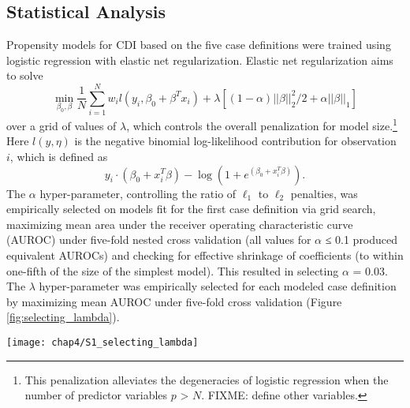 \subsection{Statistical Analysis}

Propensity models for CDI based on the five case definitions were trained using logistic regression with elastic net regularization. Elastic net regularization aims to solve $$\min_{\beta_0,\beta} \frac{1}{N} \sum_{i=1}^{N} w_i l(y_i,\beta_0+\beta^T x_i) + \lambda\left[(1-\alpha)||\beta||_2^2/2 + \alpha ||\beta||_1\right]$$ over a grid of values of $\lambda$, which controls the overall penalization for model size.\footnote{This penalization alleviates the degeneracies of logistic regression when the number of predictor variables $p$ > $N$. FIXME: define other variables.} Here $l(y,\eta)$ is the negative binomial log-likelihood contribution for observation $i$, which is defined as $$y_i \cdot (\beta_0 + x_i^T \beta) - \log (1+e^{(\beta_0+x_i^T \beta)}).$$ The $\alpha$ hyper-parameter, controlling the ratio of $\ell_1$ to $\ell_2$ penalties, was empirically selected on models fit for the first case definition via grid search, maximizing mean area under the receiver operating characteristic curve (AUROC) under five-fold nested cross validation (all values for $\alpha$ ≤ 0.1 produced equivalent AUROCs) and checking for effective shrinkage of coefficients (to within one-fifth of the size of the simplest model). This resulted in selecting $\alpha$ = 0.03. The $\lambda$ hyper-parameter was empirically selected for each modeled case definition by maximizing mean AUROC under five-fold cross validation (Figure \ref{fig:selecting_lambda}).
\begin{figure*}[tbp]
  \texttt{[image: chap4/S1\_selecting\_lambda]}
\end{figure*}
